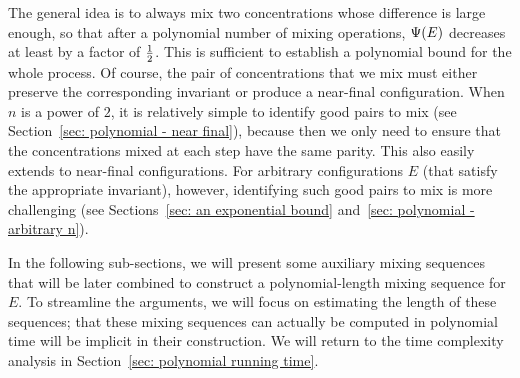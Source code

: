 The general idea is to always mix two concentrations whose difference 
is large enough, so that after a polynomial number of mixing operations,
${\Psi}(E)$ decreases at least by a factor of ${\textstyle\frac{1}{2}}$. This is sufficient to 
establish a polynomial bound for the whole process.  Of course, the  pair of
concentrations that we mix must either preserve the corresponding invariant
or produce a near-final configuration.
When $n$ is a power of $2$, it is relatively
simple to identify good pairs to mix (see Section~\ref{sec: polynomial - near final}), 
because then we only need to ensure that the 
concentrations mixed at each step have the same parity. This also easily
extends to near-final configurations.
For arbitrary configurations $E$ (that satisfy the appropriate invariant), however,
identifying such good pairs to mix is more challenging (see 
Sections~\ref{sec: an exponential bound} and~\ref{sec: polynomial - arbitrary n}).

In the following sub-sections, we will present some auxiliary mixing sequences 
that will be later combined to construct a polynomial-length mixing sequence for $E$.
To streamline the arguments, we will focus on estimating the length of these sequences;
that these mixing sequences can actually be computed in polynomial time will be implicit 
in their construction. We will return to the time complexity analysis
in Section~\ref{sec: polynomial running time}.



